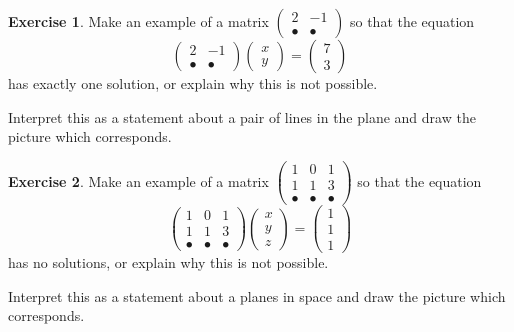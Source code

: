 \documentclass[11pt]{amsart}
\theoremstyle{definition}
\newtheorem{exercise}{Exercise}
\begin{document}
\vspace{1cm}

\begin{exercise}
Make an example of a matrix $\left( \begin{smallmatrix} 2 & -1 \\ \bullet & \bullet \end{smallmatrix}\right)$ so that the equation
\[
\begin{pmatrix} 2 & -1 \\ \bullet & \bullet \end{pmatrix}\begin{pmatrix} x \\ y \end{pmatrix} = \begin{pmatrix} 7 \\ 3 \end{pmatrix}
\]
has exactly one solution, or explain why this is not possible.

Interpret this as a statement about a pair of lines in the plane and draw the picture which corresponds.
\end{exercise}

\vspace{1cm}

\begin{exercise}
Make an example of a matrix $\left( \begin{smallmatrix} 1 & 0 & 1\\ 1 & 1 & 3 \\ \bullet & \bullet & \bullet \end{smallmatrix}\right)$ so that the equation
\[
\begin{pmatrix} 1 & 0 & 1\\ 1 & 1 & 3 \\ \bullet & \bullet & \bullet \end{pmatrix}\begin{pmatrix} x \\ y \\ z \end{pmatrix} = \begin{pmatrix} 1 \\ 1 \\ 1 \end{pmatrix}
\]
has no solutions, or explain why this is not possible.

Interpret this as a statement about a planes in space and draw the picture which corresponds.

\end{exercise}
\end{document}
